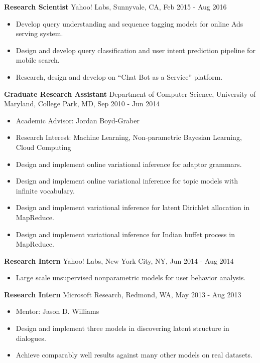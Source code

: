 {\bf Research Scientist} \hfill Yahoo! Labs, Sunnyvale, CA, Feb 2015 - Aug 2016
\begin{itemize}
\item Develop query understanding and sequence tagging models for online Ads serving system.
\item Design and develop query classification and user intent prediction pipeline for mobile search.
\item Research, design and develop on ``Chat Bot as a Service'' platform.
\end{itemize}

{\bf Graduate Research Assistant} \hfill Department of Computer Science,
University of Maryland, College Park, MD, Sep 2010 - Jun 2014
\begin{itemize}
\item Academic Advisor: Jordan Boyd-Graber
\item Research Interest: Machine Learning, Non-parametric Bayesian Learning, Cloud Computing
\item Design and implement online variational inference for adaptor grammars.
\item Design and implement online variational inference for topic models with infinite vocabulary.
\item Design and implement variational inference for latent Dirichlet allocation in MapReduce.
\item Design and implement variational inference for Indian buffet process in MapReduce.
\end{itemize}

{\bf Research Intern} \hfill Yahoo! Labs, New York City, NY, Jun 2014 - Aug 2014
\begin{itemize}
\item Large scale unsupervised nonparametric models for user behavior analysis.
\end{itemize}

{\bf Research Intern} \hfill Microsoft Research, Redmond, WA, May 2013 - Aug 2013
\begin{itemize}
\item Mentor: Jason D. Williams
\item Design and implement three models in discovering latent structure in dialogues.
\item Achieve comparably well results against many other models on real datasets.
\end{itemize}

